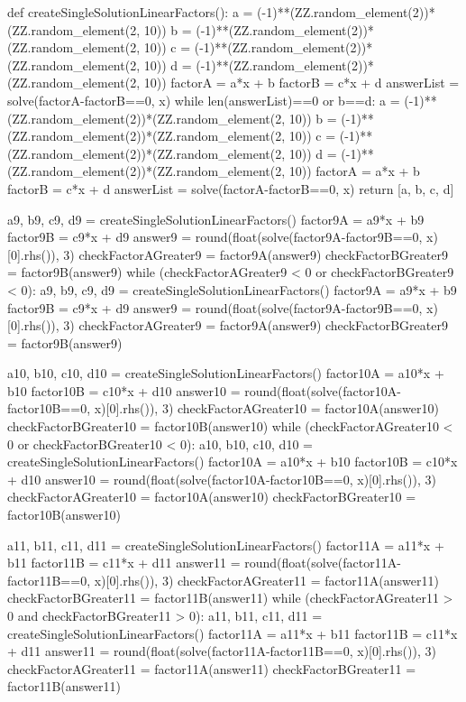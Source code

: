 \documentclass{ximera}
\begin{document}
\begin{sagesilent}
def createSingleSolutionLinearFactors(): 
    a = (-1)**(ZZ.random_element(2))*(ZZ.random_element(2, 10))
    b = (-1)**(ZZ.random_element(2))*(ZZ.random_element(2, 10))
    c = (-1)**(ZZ.random_element(2))*(ZZ.random_element(2, 10))
    d = (-1)**(ZZ.random_element(2))*(ZZ.random_element(2, 10))
    factorA = a*x + b
    factorB = c*x + d
    answerList = solve(factorA-factorB==0, x)
    while len(answerList)==0 or b==d:
        a = (-1)**(ZZ.random_element(2))*(ZZ.random_element(2, 10))
        b = (-1)**(ZZ.random_element(2))*(ZZ.random_element(2, 10))
        c = (-1)**(ZZ.random_element(2))*(ZZ.random_element(2, 10))
        d = (-1)**(ZZ.random_element(2))*(ZZ.random_element(2, 10))
        factorA = a*x + b
        factorB = c*x + d
        answerList = solve(factorA-factorB==0, x)
    return [a, b, c, d]

a9, b9, c9, d9 = createSingleSolutionLinearFactors()
factor9A = a9*x + b9
factor9B = c9*x + d9
answer9 = round(float(solve(factor9A-factor9B==0, x)[0].rhs()), 3)
checkFactorAGreater9 = factor9A(answer9)
checkFactorBGreater9 = factor9B(answer9)
while (checkFactorAGreater9 < 0 or checkFactorBGreater9 < 0):
    a9, b9, c9, d9 = createSingleSolutionLinearFactors()
    factor9A = a9*x + b9
    factor9B = c9*x + d9
    answer9 = round(float(solve(factor9A-factor9B==0, x)[0].rhs()), 3)
    checkFactorAGreater9 = factor9A(answer9)
    checkFactorBGreater9 = factor9B(answer9)

a10, b10, c10, d10 = createSingleSolutionLinearFactors()
factor10A = a10*x + b10
factor10B = c10*x + d10
answer10 = round(float(solve(factor10A-factor10B==0, x)[0].rhs()), 3)
checkFactorAGreater10 = factor10A(answer10)
checkFactorBGreater10 = factor10B(answer10)
while (checkFactorAGreater10 < 0 or checkFactorBGreater10 < 0):
    a10, b10, c10, d10 = createSingleSolutionLinearFactors()
    factor10A = a10*x + b10
    factor10B = c10*x + d10
    answer10 = round(float(solve(factor10A-factor10B==0, x)[0].rhs()), 3)
    checkFactorAGreater10 = factor10A(answer10)
    checkFactorBGreater10 = factor10B(answer10)

a11, b11, c11, d11 = createSingleSolutionLinearFactors()
factor11A = a11*x + b11
factor11B = c11*x + d11
answer11 = round(float(solve(factor11A-factor11B==0, x)[0].rhs()), 3)
checkFactorAGreater11 = factor11A(answer11)
checkFactorBGreater11 = factor11B(answer11)
while (checkFactorAGreater11 > 0 and checkFactorBGreater11 > 0):
    a11, b11, c11, d11 = createSingleSolutionLinearFactors()
    factor11A = a11*x + b11
    factor11B = c11*x + d11
    answer11 = round(float(solve(factor11A-factor11B==0, x)[0].rhs()), 3)
    checkFactorAGreater11 = factor11A(answer11)
    checkFactorBGreater11 = factor11B(answer11)


\end{sagesilent}
\end{document}
